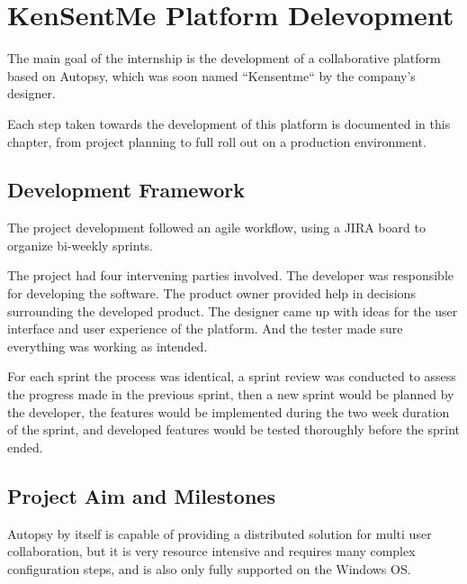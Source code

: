 
\chapter{KenSentMe Platform Delevopment}
\label{ch:development}


The main goal of the internship is the development of a collaborative platform based on Autopsy, which was soon named ``Kensentme`` by the company's designer.

Each step taken towards the development of this platform is documented in this chapter, from project planning to full roll out on a production environment.

\section{Development Framework}

The project development followed an agile workflow, using a JIRA \cite{jira} board to organize bi-weekly sprints.

The project had four intervening parties involved. The developer was responsible for developing the software. The product owner provided help in decisions surrounding the developed product. 
The designer came up with ideas for the user interface and user experience of the platform. And the tester made sure everything was working as intended.

For each sprint the process was identical, a sprint review was conducted to assess the progress made in the previous sprint, then a new sprint would be planned by the developer, 
the features would be implemented during the two week duration of the sprint, and developed features would be tested thoroughly before the sprint ended.

\section{Project Aim and Milestones}

Autopsy by itself is capable of providing a distributed solution for multi user collaboration, but it is very resource intensive and requires many complex configuration steps,
and is also only fully supported on the Windows OS.

